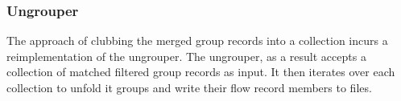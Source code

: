\subsubsection{Ungrouper} The approach of clubbing the merged group records into
a collection incurs a reimplementation of the ungrouper. The ungrouper, as a
result accepts a collection of matched filtered group records as input. It
then iterates over each collection to unfold it groups and write their flow
record members to files.

